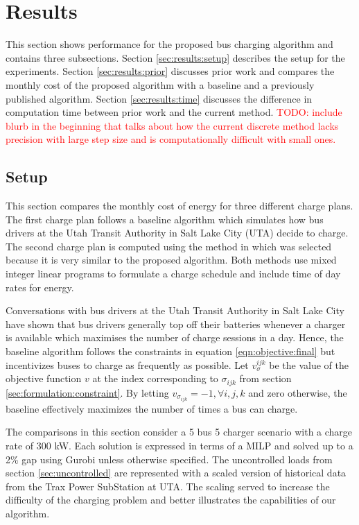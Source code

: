 \section{Results\label{sec:results}}
This section shows performance for the proposed bus charging algorithm and contains three subsections. Section \ref{sec:results:setup} describes the setup for the experiments. Section \ref{sec:results:prior} discusses prior work and compares the monthly cost of the proposed algorithm with a baseline and a previously published algorithm. Section \ref{sec:results:time} discusses the difference in computation time between prior work and the current method.
\textcolor{red}{TODO: include blurb in the beginning that talks about how the current discrete method lacks precision with large step size and is computationally difficult with small ones.}
\subsection{Setup\label{sec:results:setup}}
This section compares the monthly cost of energy for three different charge plans.  The first charge plan follows a baseline algorithm which simulates how bus drivers at the Utah Transit Authority in Salt Lake City (UTA) decide to charge. The second charge plan is computed using the method in \cite{He_2019_Fast} which was selected because it is very similar to the proposed algorithm.  Both methods use mixed integer linear programs to formulate a charge schedule and include time of day rates for energy. 
\par Conversations with bus drivers at the Utah Transit Authority in Salt Lake City have shown that bus drivers generally top off their batteries whenever a charger is available which maximises the number of charge sessions in a day. Hence, the baseline algorithm follows the constraints in equation \ref{eqn:objective:final} but incentivizes buses to charge as frequently as possible. Let $v_{\sigma}^{ijk}$ be the value of the objective function $v$ at the index corresponding to $\sigma_{ijk}$ from section \ref{sec:formulation:constraint}. By letting $v_{\sigma_{ijk}} = -1, \forall i,j,k$ and zero otherwise, the baseline effectively maximizes the number of times a bus can charge. 
\par The comparisons in this section consider a 5 bus 5 charger scenario with a charge rate of 300 kW. Each solution is expressed in terms of a MILP and solved up to a 2\% gap using Gurobi \cite{gurobi} unless otherwise specified. The uncontrolled loads from section \ref{sec:uncontrolled} are represented with a scaled version of historical data from the Trax Power SubStation at UTA. The scaling served to increase the difficulty of the charging problem and better illustrates the capabilities of our algorithm. 

